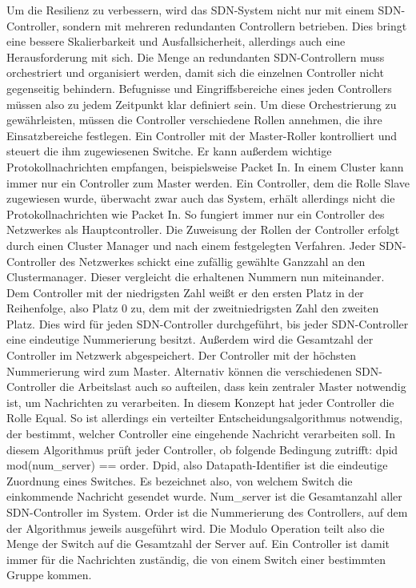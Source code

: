 Um die Resilienz zu verbessern, wird das SDN-System nicht nur mit einem SDN-Controller, sondern mit mehreren redundanten Controllern betrieben. Dies bringt eine bessere Skalierbarkeit und Ausfallsicherheit, 
allerdings auch eine Herausforderung mit sich. Die Menge an redundanten SDN-Controllern muss orchestriert und organisiert werden, damit sich die einzelnen Controller nicht gegenseitig behindern. 
Befugnisse und Eingriffsbereiche eines jeden Controllers müssen also zu jedem Zeitpunkt klar definiert sein. Um diese Orchestrierung zu gewährleisten, müssen die Controller verschiedene Rollen annehmen, 
die ihre Einsatzbereiche festlegen. Ein Controller mit der Master-Roller kontrolliert und steuert die ihm zugewiesenen Switche. Er kann außerdem wichtige Protokollnachrichten empfangen, beispielsweise Packet In. 
In einem Cluster kann immer nur ein Controller zum Master werden. Ein Controller, dem die Rolle Slave zugewiesen wurde, überwacht zwar auch das System, erhält allerdings nicht die Protokollnachrichten wie Packet In. 
So fungiert immer nur ein Controller des Netzwerkes als Hauptcontroller. Die Zuweisung der Rollen der Controller erfolgt durch einen Cluster Manager und nach einem festgelegten Verfahren. 
Jeder SDN-Controller des Netzwerkes schickt eine zufällig gewählte Ganzzahl an den Clustermanager. Dieser vergleicht die erhaltenen Nummern nun miteinander. 
Dem Controller mit der niedrigsten Zahl weißt er den ersten Platz in der Reihenfolge, also Platz 0 zu, dem mit der zweitniedrigsten Zahl den zweiten Platz. Dies wird für jeden SDN-Controller durchgeführt, 
bis jeder SDN-Controller eine eindeutige Nummerierung besitzt. Außerdem wird die Gesamtzahl der Controller im Netzwerk abgespeichert. Der Controller mit der höchsten Nummerierung wird zum Master. 
Alternativ können die verschiedenen SDN-Controller die Arbeitslast auch so aufteilen, dass kein zentraler Master notwendig ist, um Nachrichten zu verarbeiten. In diesem Konzept hat jeder Controller die Rolle Equal. 
So ist allerdings ein verteilter Entscheidungsalgorithmus notwendig, der bestimmt, welcher Controller eine eingehende Nachricht verarbeiten soll. In diesem Algorithmus prüft jeder Controller, ob folgende Bedingung zutrifft: 
dpid mod(num_server) == order. Dpid, also Datapath-Identifier ist die eindeutige Zuordnung eines Switches. Es bezeichnet also, von welchem Switch die einkommende Nachricht gesendet wurde. 
Num_server ist die Gesamtanzahl aller SDN-Controller im System. Order ist die Nummerierung des Controllers, auf dem der Algorithmus jeweils ausgeführt wird. 
Die Modulo Operation teilt also die Menge der Switch auf die Gesamtzahl der Server auf. Ein Controller ist damit immer für die Nachrichten zuständig, die von einem Switch einer bestimmten Gruppe kommen. 
